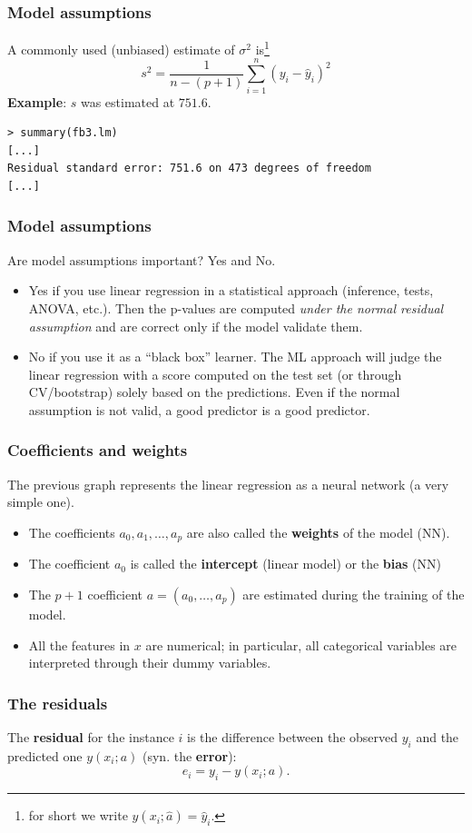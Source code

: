 \begin{frame}[fragile]
\frametitle{Model assumptions}
A commonly used (unbiased) estimate of $\sigma^2$ is\footnote{for short we write $y(x_i;\hat{a})=\hat{y}_i$.} 
$$
s^2 = \frac{1}{n-(p+1)} \sum_{i=1}^n (y_i-\hat{y}_i)^2
$$
{\bf Example}: $s$ was estimated at $751.6$.\\
\scriptsize
\begin{verbatim}
> summary(fb3.lm)
[...]
Residual standard error: 751.6 on 473 degrees of freedom
[...]
\end{verbatim}
\end{frame}
\begin{frame}
\frametitle{Model assumptions}
Are model assumptions important? Yes and No.
\begin{itemize}
\item Yes if you use linear regression in a statistical approach (inference, tests, ANOVA, etc.). Then the p-values are computed {\it under the normal residual assumption} and are correct only if the model validate them.
\item No if you use it as a ``black box'' learner. The ML approach will judge the linear regression with a score computed on the test set (or through CV/bootstrap) solely based on the predictions. Even if the normal assumption is not valid, a good predictor is a good predictor.
\end{itemize}
\end{frame}
\begin{frame}
\frametitle{Coefficients and weights}
The previous graph represents the linear regression as a neural network (a very simple one).
\begin{itemize}
\item The coefficients $a_0, a_1, \ldots, a_p$ are also called the {\bf weights} of the model (NN). 
\item The coefficient $a_0$ is called the {\bf intercept} (linear model) or the {\bf bias} (NN)
\item The $p+1$ coefficient $a=(a_0,\ldots,a_p)$ are estimated during the training of the model.\\
\item All the features in $x$ are numerical; in particular, all categorical variables are interpreted through their dummy variables. 
\end{itemize}
\end{frame}
\begin{frame}
\frametitle{The residuals}
The {\bf residual} for the instance $i$ is the difference between the observed $y_i$ and the predicted one $y(x_i;a)$ (syn. the {\bf error}):
$$
e_i = y_i - y(x_i;a).
$$
\end{frame}
